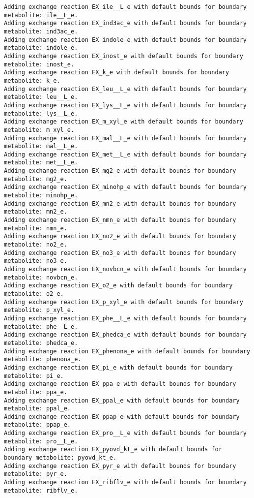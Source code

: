 \documentclass[
  letterpaper,
  DIV=11,
  numbers=noendperiod]{scrartcl}
\begin{document}
\begin{verbatim}
Adding exchange reaction EX_ile__L_e with default bounds for boundary metabolite: ile__L_e.
Adding exchange reaction EX_ind3ac_e with default bounds for boundary metabolite: ind3ac_e.
Adding exchange reaction EX_indole_e with default bounds for boundary metabolite: indole_e.
Adding exchange reaction EX_inost_e with default bounds for boundary metabolite: inost_e.
Adding exchange reaction EX_k_e with default bounds for boundary metabolite: k_e.
Adding exchange reaction EX_leu__L_e with default bounds for boundary metabolite: leu__L_e.
Adding exchange reaction EX_lys__L_e with default bounds for boundary metabolite: lys__L_e.
Adding exchange reaction EX_m_xyl_e with default bounds for boundary metabolite: m_xyl_e.
Adding exchange reaction EX_mal__L_e with default bounds for boundary metabolite: mal__L_e.
Adding exchange reaction EX_met__L_e with default bounds for boundary metabolite: met__L_e.
Adding exchange reaction EX_mg2_e with default bounds for boundary metabolite: mg2_e.
Adding exchange reaction EX_minohp_e with default bounds for boundary metabolite: minohp_e.
Adding exchange reaction EX_mn2_e with default bounds for boundary metabolite: mn2_e.
Adding exchange reaction EX_nmn_e with default bounds for boundary metabolite: nmn_e.
Adding exchange reaction EX_no2_e with default bounds for boundary metabolite: no2_e.
Adding exchange reaction EX_no3_e with default bounds for boundary metabolite: no3_e.
Adding exchange reaction EX_novbcn_e with default bounds for boundary metabolite: novbcn_e.
Adding exchange reaction EX_o2_e with default bounds for boundary metabolite: o2_e.
Adding exchange reaction EX_p_xyl_e with default bounds for boundary metabolite: p_xyl_e.
Adding exchange reaction EX_phe__L_e with default bounds for boundary metabolite: phe__L_e.
Adding exchange reaction EX_phedca_e with default bounds for boundary metabolite: phedca_e.
Adding exchange reaction EX_phenona_e with default bounds for boundary metabolite: phenona_e.
Adding exchange reaction EX_pi_e with default bounds for boundary metabolite: pi_e.
Adding exchange reaction EX_ppa_e with default bounds for boundary metabolite: ppa_e.
Adding exchange reaction EX_ppal_e with default bounds for boundary metabolite: ppal_e.
Adding exchange reaction EX_ppap_e with default bounds for boundary metabolite: ppap_e.
Adding exchange reaction EX_pro__L_e with default bounds for boundary metabolite: pro__L_e.
Adding exchange reaction EX_pyovd_kt_e with default bounds for boundary metabolite: pyovd_kt_e.
Adding exchange reaction EX_pyr_e with default bounds for boundary metabolite: pyr_e.
Adding exchange reaction EX_ribflv_e with default bounds for boundary metabolite: ribflv_e.

\end{verbatim}
\end{document}
